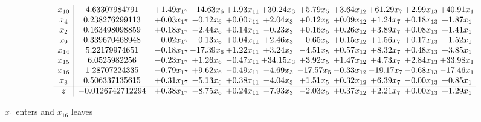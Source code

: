 \documentclass[9pt]{article}
\begin{document}
 \[\begin{array}{c| c c@{\hskip 2pt} c@{\hskip 2pt} c@{\hskip 2pt} c@{\hskip 2pt} c@{\hskip 2pt} c@{\hskip 2pt} c@{\hskip 2pt} c@{\hskip 2pt} c@{\hskip 2pt} }
 x_{10}   &  4.63307984791 & +  1.49 x_{17} & -14.63 x_{6} & +  1.93 x_{11} & + 30.24 x_{3} & +  5.79 x_{5} & +  3.64 x_{12} & + 61.29 x_{7} & +  2.99 x_{13} & + 40.91 x_{1}\\
 x_{4}   &  0.238276299113 & +  0.03 x_{17} & -0.12 x_{6} & +  0.00 x_{11} & +  2.04 x_{3} & +  0.12 x_{5} & +  0.09 x_{12} & +  1.24 x_{7} & +  0.18 x_{13} & +  1.87 x_{1}\\
 x_{2}   &  0.163498098859 & +  0.18 x_{17} & -2.44 x_{6} & +  0.14 x_{11} & -0.23 x_{3} & +  0.16 x_{5} & +  0.26 x_{12} & +  3.89 x_{7} & +  0.08 x_{13} & +  1.41 x_{1}\\
 x_{9}   &  0.339670468948 & -0.02 x_{17} & -0.13 x_{6} & +  0.04 x_{11} & +  2.46 x_{3} & -0.65 x_{5} & +  0.15 x_{12} & +  1.56 x_{7} & +  0.17 x_{13} & +  1.52 x_{1}\\
 x_{14}   &  5.22179974651 & -0.18 x_{17} & -17.39 x_{6} & +  1.22 x_{11} & +  3.24 x_{3} & -4.51 x_{5} & +  0.57 x_{12} & +  8.32 x_{7} & +  0.48 x_{13} & +  3.85 x_{1}\\
 x_{15}   &  6.0525982256 & -0.23 x_{17} & +  1.26 x_{6} & -0.47 x_{11} & + 34.15 x_{3} & +  3.92 x_{5} & +  1.47 x_{12} & +  4.73 x_{7} & +  2.84 x_{13} & + 33.98 x_{1}\\
 x_{16}   &  1.28707224335 & -0.79 x_{17} & +  9.62 x_{6} & -0.49 x_{11} & -4.69 x_{3} & -17.57 x_{5} & -0.33 x_{12} & -19.17 x_{7} & -0.68 x_{13} & -17.46 x_{1}\\
 x_{8}   &  0.506337135615 & +  0.31 x_{17} & -5.13 x_{6} & +  0.38 x_{11} & -4.04 x_{3} & +  1.51 x_{5} & +  0.32 x_{12} & +  6.39 x_{7} & -0.00 x_{13} & +  0.85 x_{1}\\
\hline
z    &  -0.0126742712294 & +  0.38 x_{17} & -8.75 x_{6} & +  0.24 x_{11} & -7.93 x_{3} & -2.03 x_{5} & +  0.37 x_{12} & +  2.21 x_{7} & +  0.00 x_{13} & +  1.29 x_{1}\\
\end{array}\]


 $ x_{1} $ enters and $ x_{16} $ leaves 
\end{document}
